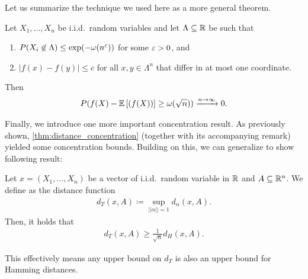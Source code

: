 Let us summarize the technique we used here as a more general theorem.
\begin{theorem}
    Let $X_1, \dots, X_n$ be i.i.d.~random variables and let $\Lambda \subseteq \mathbb{R}$ be
    such that
    \begin{enumerate}
        \item $P(X_i \not\in \Lambda) \leq \exp(- \omega(n^\varepsilon))$ for some $\varepsilon > 0$, and
        \item $|f(x) - f(y)| \leq c$ for all $x,y \in \Lambda^n$ that differ in at most one coordinate.
    \end{enumerate}
    Then
    \begin{align*}
        P(f(X) - \mathbb{E}\left[(f(X))\right] \geq \omega(\sqrt{n})) \xrightarrow{n \rightarrow \infty} 0.
    \end{align*}
\end{theorem}
Finally, we introduce one more important concentration result.
As previously shown, \autoref{thm:distance_concentration} (together with its accompanying remark) yielded some concentration bounds.
Building on this, we can generalize to show following result:
\begin{theorem}
    Let $x=(X_1, \dots, X_n)$ be a vector of i.i.d.~random variable in $\mathbb{R}$ and $A \subseteq \mathbb{R}^n$.
    We define  as the distance function
    \begin{align*}
        d_T(x,A) \coloneqq \sup_{||\alpha||=1}d_\alpha(x,A).
    \end{align*}
    Then, it holds that
    \begin{align*}
        d_T(x,A) \geq \frac{1}{\sqrt{n}}d_H(x,A).
    \end{align*}
\end{theorem}
This effectively means any upper bound on $d_T$ is also an upper bound for Hamming distances.
